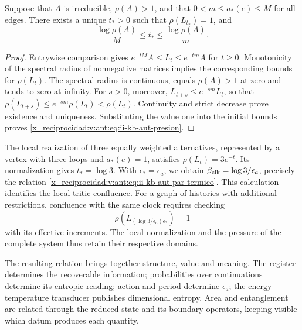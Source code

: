 \begin{proposition}
Suppose that \(A\) is irreducible, \(\rho(A)>1\), and that
\(0<m\leq a_*(e)\leq M\) for all edges. There exists a unique
\(t_*>0\) such that \(\rho(L_{t_*})=1\), and
\begin{equation}
 \frac{\log\rho(A)}{M}\leq t_*\leq
 \frac{\log\rho(A)}{m}.
 \label{x_reciprocidad:v:ant:eq:ii-kb-aut-presion}
\end{equation}
\end{proposition}
\begin{proof}
Entrywise comparison gives
\(e^{-tM}A\leq L_t\leq e^{-tm}A\) for \(t\geq0\).
Monotonicity of the spectral radius of nonnegative matrices implies
the corresponding bounds for \(\rho(L_t)\). The spectral radius
is continuous, equals \(\rho(A)>1\) at zero and tends to zero at infinity.
For \(s>0\), moreover,
\(L_{t+s}\leq e^{-sm}L_t\), so that
\(\rho(L_{t+s})\leq e^{-sm}\rho(L_t)<\rho(L_t)\).
Continuity and strict decrease prove existence and
uniqueness. Substituting the value one into the initial bounds proves
\eqref{x_reciprocidad:v:ant:eq:ii-kb-aut-presion}.
\end{proof}

The local realization of three equally weighted alternatives, represented
by a vertex with three loops and \(a_*(e)=1\), satisfies
\(\rho(L_t)=3e^{-t}\). Its normalization gives \(t_*=\log3\).
With \(\epsilon_*=\epsilon_a\), we obtain
\(\beta_{\rm clk}=\log3/\epsilon_a\), precisely the relation
\eqref{x_reciprocidad:v:ant:eq:ii-kb-aut-par-termico}. This calculation identifies the
local tritic confluence. For a graph of histories with additional
restrictions, confluence with the same clock requires checking
\[
 \rho\!\left(L_{(\log3/\epsilon_a)\epsilon_*}\right)=1
\]
with its effective increments. The local normalization and the pressure
of the complete system thus retain their respective domains.

The resulting relation brings together structure, value and meaning. The register
determines the recoverable information; probabilities over
continuations determine its entropic reading; action and period
determine \(\epsilon_a\); the energy--temperature transducer
publishes dimensional entropy. Area and entanglement are
related through the reduced state and its boundary operators,
keeping visible which datum produces each quantity.



